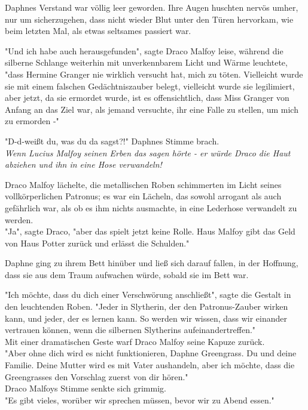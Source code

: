 {Daphnes Verstand war völlig leer geworden. Ihre Augen huschten nervös umher, nur um sicherzugehen, dass nicht wieder Blut unter den Türen hervorkam, wie beim letzten Mal, als etwas seltsames passiert war.

"Und ich habe auch herausgefunden", sagte Draco Malfoy leise, während die silberne Schlange weiterhin mit unverkennbarem Licht und Wärme leuchtete, "dass Hermine Granger nie wirklich versucht hat, mich zu töten. Vielleicht wurde sie mit einem falschen Gedächtniszauber belegt, vielleicht wurde sie legilimiert, aber jetzt, da sie ermordet wurde, ist es offensichtlich, dass Miss Granger von Anfang an das Ziel war, als jemand versuchte, ihr eine Falle zu stellen, um mich zu ermorden -"

"D-d-weißt du, was du da sagst?!" Daphnes Stimme brach.\\ \emph{Wenn Lucius Malfoy seinen Erben das sagen hörte - er würde Draco die Haut abziehen und ihn in eine Hose verwandeln!}

Draco Malfoy lächelte, die metallischen Roben schimmerten im Licht seines vollkörperlichen Patronus; es war ein Lächeln, das sowohl arrogant als auch gefährlich war, als ob es ihm nichts ausmachte, in eine Lederhose verwandelt zu werden.\\ "Ja", sagte Draco, "aber das spielt jetzt keine Rolle. Haus Malfoy gibt das Geld von Haus Potter zurück und erlässt die Schulden."

Daphne ging zu ihrem Bett hinüber und ließ sich darauf fallen, in der Hoffnung, dass sie aus dem Traum aufwachen würde, sobald sie im Bett war.

"Ich möchte, dass du dich einer Verschwörung anschließt", sagte die Gestalt in den leuchtenden Roben. "Jeder in Slytherin, der den Patronus-Zauber wirken kann, und jeder, der es lernen kann. So werden wir wissen, dass wir einander vertrauen können, wenn die silbernen Slytherins aufeinandertreffen."\\ Mit einer dramatischen Geste warf Draco Malfoy seine Kapuze zurück.\\ "Aber ohne dich wird es nicht funktionieren, Daphne Greengrass. Du und deine Familie. Deine Mutter wird es mit Vater aushandeln, aber ich möchte, dass die Greengrasses den Vorschlag zuerst von dir hören."\\ Draco Malfoys Stimme senkte sich grimmig.\\ "Es gibt vieles, worüber wir sprechen müssen, bevor wir zu Abend essen."

}
